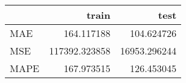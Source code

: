 \begin{tabular}{lrr}
\toprule
{} &          train &          test \\
\midrule
MAE  &     164.117188 &    104.624726 \\
MSE  &  117392.323858 &  16953.296244 \\
MAPE &     167.973515 &    126.453045 \\
\bottomrule
\end{tabular}
